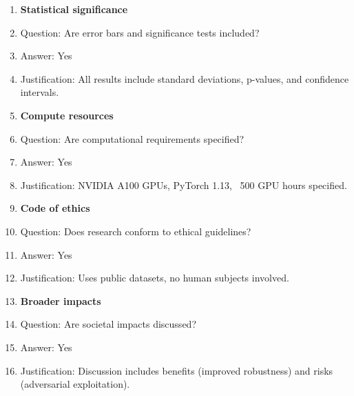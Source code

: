 \documentclass{article}
\begin{document}
\begin{enumerate}
\item {\bf Statistical significance}
    \item[] Question: Are error bars and significance tests included?
    \item[] Answer: Yes
    \item[] Justification: All results include standard deviations, p-values, and confidence intervals.

\item {\bf Compute resources}
    \item[] Question: Are computational requirements specified?
    \item[] Answer: Yes
    \item[] Justification: NVIDIA A100 GPUs, PyTorch 1.13, ~500 GPU hours specified.

\item {\bf Code of ethics}
    \item[] Question: Does research conform to ethical guidelines?
    \item[] Answer: Yes
    \item[] Justification: Uses public datasets, no human subjects involved.

\item {\bf Broader impacts}
    \item[] Question: Are societal impacts discussed?
    \item[] Answer: Yes
    \item[] Justification: Discussion includes benefits (improved robustness) and risks (adversarial exploitation).

\end{enumerate}
\end{document}

